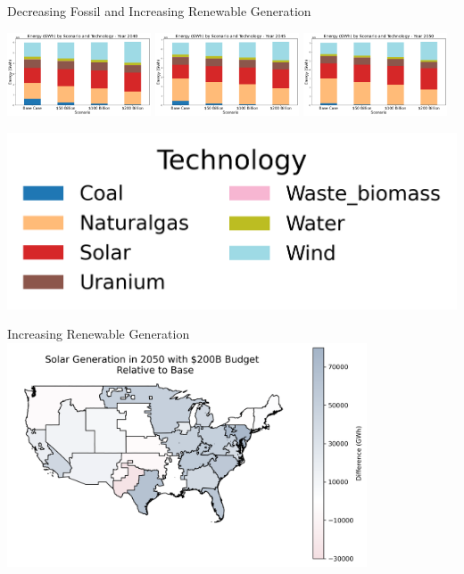 \documentclass{beamer}
\begin{document}
\begin{frame}{Decreasing Fossil and Increasing Renewable Generation}
\begin{adjustwidth}{-3em}{-1.5em}
    \begin{minipage}{1.1\textwidth}
        \centering
        \includegraphics[width=0.32\textwidth]{Figures/EndogenousPaper/Dispatch_Relative_by_scenario_2040.png} \hfill
        \includegraphics[width=0.32\textwidth]{Figures/EndogenousPaper/Dispatch_Relative_by_scenario_2045.png} \hfill
        \includegraphics[width=0.32\textwidth]{Figures/EndogenousPaper/Dispatch_Relative_by_scenario_2050.png}
    \end{minipage}
\end{adjustwidth}
\vspace{.5cm}
\centering
\includegraphics[scale=.3]{Figures/EndogenousPaper/Legend_2050.png}
\end{frame}


\begin{frame}{Increasing Renewable Generation}
    \centering
    \includegraphics[width=0.8\textwidth]{Figures/EndogenousPaper/solar_generation_map.png}
\end{frame}
\end{document}
